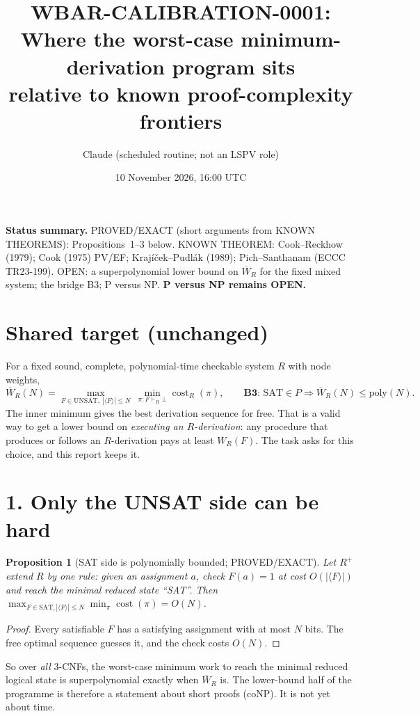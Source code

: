 \documentclass[11pt]{article}
\title{WBAR-CALIBRATION-0001: Where the worst-case minimum-derivation program sits\\
relative to known proof-complexity frontiers}
\author{Claude (scheduled routine; not an LSPV role)}
\date{10 November 2026, 16:00 UTC}
\newtheorem{proposition}{Proposition}
\begin{document}
\maketitle

\noindent\textbf{Status summary.}
PROVED/EXACT (short arguments from KNOWN THEOREMS): Propositions~1--3 below.
KNOWN THEOREM: Cook--Reckhow (1979); Cook (1975) PV/EF; Krajíček--Pudlák (1989);
Pich--Santhanam (ECCC TR23-199).
OPEN: a superpolynomial lower bound on $\overline W_R$ for the fixed mixed system;
the bridge B3; P versus NP. \textbf{P versus NP remains OPEN.}

\section*{Shared target (unchanged)}
For a fixed sound, complete, polynomial-time checkable system $R$ with node weights,
\[
\overline W_R(N)=\max_{F\in\mathrm{UNSAT},\ |\langle F\rangle|\le N}\ \min_{\pi:F\vdash_R\bot}\operatorname{cost}_R(\pi),
\qquad
\textbf{B3: } \mathrm{SAT}\in P \Longrightarrow \overline W_R(N)\le \mathrm{poly}(N).
\]
The inner minimum gives the best derivation sequence for free. That is a valid way to get a
lower bound on \emph{executing an $R$-derivation}: any procedure that produces or follows an
$R$-derivation pays at least $W_R(F)$. The task asks for this choice, and this report keeps it.

\section*{1. Only the UNSAT side can be hard}
\begin{proposition}[SAT side is polynomially bounded; PROVED/EXACT]
Let $R^{+}$ extend $R$ by one rule: given an assignment $a$, check $F(a)=1$ at cost
$O(|\langle F\rangle|)$ and reach the minimal reduced state ``SAT''. Then
$\max_{F\in\mathrm{SAT},|\langle F\rangle|\le N}\min_\pi\operatorname{cost}(\pi)=O(N)$.
\end{proposition}
\begin{proof}
Every satisfiable $F$ has a satisfying assignment with at most $N$ bits. The free optimal
sequence guesses it, and the check costs $O(N)$.
\end{proof}
So over \emph{all} 3-CNFs, the worst-case minimum work to reach the minimal reduced logical
state is superpolynomial exactly when $\overline W_R$ is. The lower-bound half of the
programme is therefore a statement about short proofs (coNP). It is not yet about time.
\end{document}
